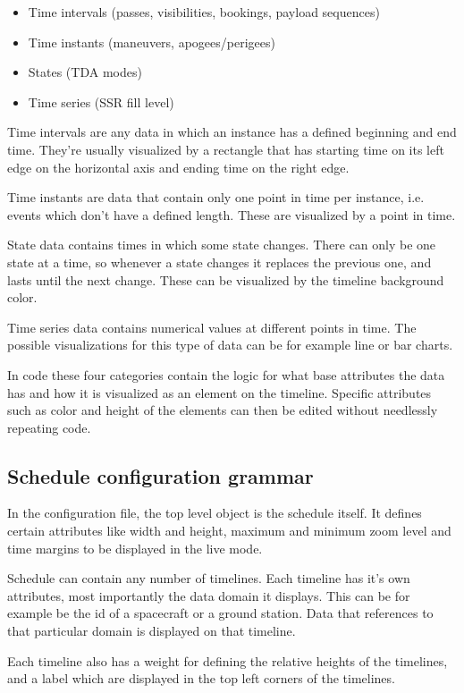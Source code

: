 \begin{itemize}
\item Time intervals (passes, visibilities, bookings, payload sequences)
\item Time instants (maneuvers, apogees/perigees)
\item States (TDA modes)
\item Time series (SSR fill level)
\end{itemize}

Time intervals are any data in which an instance has a defined beginning and end time. They're usually visualized by a rectangle that has starting time on its left edge on the horizontal axis and ending time on the right edge.

Time instants are data that contain only one point in time per instance, i.e. events which don't have a defined length. These are visualized by a point in time.

State data contains times in which some state changes. There can only be one state at a time, so whenever a state changes it replaces the previous one, and lasts until the next change. These can be visualized by the timeline background color.

Time series data contains numerical values at different points in time. The possible visualizations for this type of data can be for example line or bar charts.

In code these four categories contain the logic for what base attributes the data has and how it is visualized as an element on the timeline. Specific attributes such as color and height of the elements can then be edited without needlessly repeating  code.

\subsection{Schedule configuration grammar}
In the configuration file, the top level object is the schedule itself. It defines certain attributes like width and height, maximum and minimum zoom level and time margins to be displayed in the live mode.

Schedule can contain any number of timelines. Each timeline has it's own attributes, most importantly the data domain it displays. This can be for example be the id of a spacecraft or a ground station. Data that references to that particular domain is displayed on that timeline. 

Each timeline also has a weight for defining the relative heights of the timelines, and a label which are displayed in the top left corners of the timelines.

